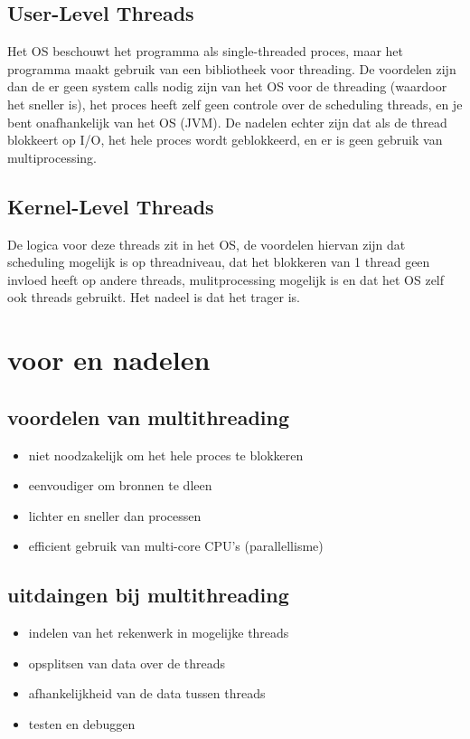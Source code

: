 \documentclass{report}
\begin{document}
   			\subsection{User-Level Threads}
   				Het OS beschouwt het programma als single-threaded proces, maar het programma maakt gebruik van een bibliotheek voor threading. De voordelen zijn dan de er geen system calls nodig zijn van het OS voor de threading (waardoor het sneller is), het proces heeft zelf geen controle over de scheduling threads, en je bent onafhankelijk van het OS (JVM). De nadelen echter zijn dat als de thread blokkeert op I/O, het hele proces wordt geblokkeerd, en er is geen gebruik van multiprocessing. 
   			\subsection{Kernel-Level Threads}
   				De logica voor deze threads zit in het OS, de voordelen hiervan zijn dat scheduling mogelijk is op threadniveau, dat het blokkeren van 1 thread geen invloed heeft op andere threads, mulitprocessing mogelijk is en dat het OS zelf ook threads gebruikt. Het nadeel is dat het trager is. 
   		\section{voor en nadelen}
   			\subsection{voordelen van multithreading}
   				\begin{itemize}
   					\item niet noodzakelijk om het hele proces te blokkeren 
   					\item eenvoudiger om bronnen te dleen 
   					\item lichter en sneller dan processen 
   					\item efficient gebruik van multi-core CPU's (parallellisme)
   				\end{itemize}
   			\subsection{uitdaingen bij multithreading}
   				\begin{itemize}
   					\item indelen van het rekenwerk in mogelijke threads
   					\item opsplitsen van data over de threads
   					\item afhankelijkheid van de data tussen threads
   					\item testen en debuggen
   				\end{itemize}
\end{document}
